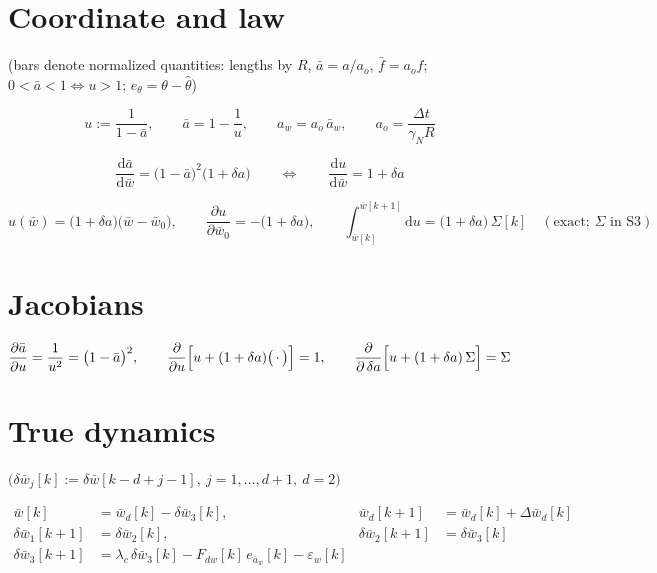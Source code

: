\documentclass[11pt,a4paper,fontset=none]{ctexart}
\newcommand{\ba}{\bar{a}}
\newcommand{\bw}{\bar{w}}
\begin{document}
\section{Coordinate and law}

(bars denote normalized quantities: lengths by $R$, $\ba = a/a_o$,
$\bar{f} = a_o f$; $0 < \ba < 1 \Leftrightarrow u > 1$;
$e_{\theta} = \theta - \hat{\theta}$)

\begin{equation*}
u := \frac{1}{1-\ba},
\qquad
\ba = 1 - \frac{1}{u},
\qquad
a_w = a_o\,\ba_w ,
\qquad
a_o = \frac{\Delta t}{\gamma_N R}
\end{equation*}

\begin{equation*}
\frac{\mathrm{d}\ba}{\mathrm{d}\bw} = \bigl(1-\ba\bigr)^{2}\bigl(1+\delta a\bigr)
\qquad\Longleftrightarrow\qquad
\frac{\mathrm{d}u}{\mathrm{d}\bw} = 1 + \delta a
\end{equation*}

\begin{equation*}
u(\bw) = \bigl(1+\delta a\bigr)\bigl(\bw - \bw_0\bigr),
\qquad
\frac{\partial u}{\partial \bw_0} = -\bigl(1+\delta a\bigr),
\qquad
\int_{\bw[k]}^{\bw[k+1]}\!\!\mathrm{d}u
 = \bigl(1+\delta a\bigr)\,\Sigma[k] \quad(\text{exact; } \Sigma \text{ in S3})
\end{equation*}

\section{Jacobians}

\begin{equation*}
\frac{\partial \ba}{\partial u} = \frac{1}{u^{2}} = \bigl(1-\ba\bigr)^{2},
\qquad
\frac{\partial}{\partial u}\Bigl[u + (1+\delta a)\bigl(\,\cdot\,\bigr)\Bigr] = 1,
\qquad
\frac{\partial}{\partial\,\delta a}
  \Bigl[u + (1+\delta a)\,\Sigma\Bigr] = \Sigma
\end{equation*}

\section{True dynamics}

$\bigl(\delta\bw_j[k] := \delta\bw[k-d+j-1],\ j = 1,\dots,d+1,\ d = 2\bigr)$

\begin{align*}
\bw[k] &= \bw_d[k] - \delta\bw_3[k], &
\bw_d[k+1] &= \bw_d[k] + \Delta\bw_d[k] \\
\delta\bw_1[k+1] &= \delta\bw_2[k], &
\delta\bw_2[k+1] &= \delta\bw_3[k] \\
\delta\bw_3[k+1] &= \lambda_c\,\delta\bw_3[k] - F_{dw}[k]\,e_{\ba_w}[k]
  - \varepsilon_w[k]
\end{align*}
\end{document}
